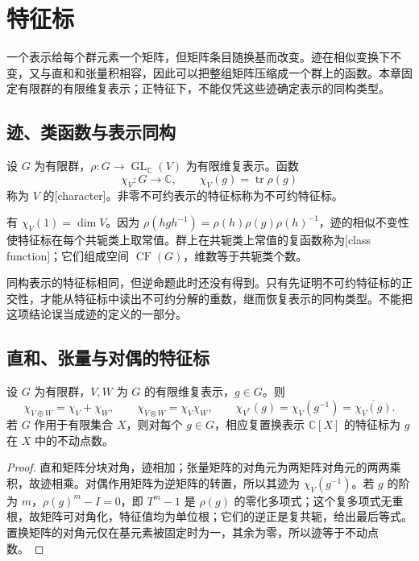 

\section{特征标}
\label{b5:sec:0201}

一个表示给每个群元素一个矩阵，但矩阵条目随换基而改变。迹在相似变换下不变，又与直和和张量积相容，因此可以把整组矩阵压缩成一个群上的函数。本章固定有限群的有限维复表示；正特征下，不能仅凭这些迹确定表示的同构类型。


\subsection{迹、类函数与表示同构}
\label{b5:subsec:0201:01}

\begin{definition}\label{b5:def:character}
	设 \(G\) 为有限群，\(\rho:G\to\operatorname{GL}_{\mathbb C}(V)\) 为有限维复表示。函数
	\[
		\chi_V:G\longrightarrow\mathbb C,\qquad \chi_V(g)=\operatorname{tr}\rho(g)
	\]
	称为 \(V\) 的[character]。非零不可约表示的特征标称为不可约特征标。
\end{definition}

有 \(\chi_V(1)=\dim V\)。因为 \(\rho(hgh^{-1})=\rho(h)\rho(g)\rho(h)^{-1}\)，迹的相似不变性使特征标在每个共轭类上取常值。群上在共轭类上常值的复函数称为[class function]；它们组成空间 \(\operatorname{CF}(G)\)，维数等于共轭类个数。

\ProseParagraphBreak
同构表示的特征标相同，但逆命题此时还没有得到。只有先证明不可约特征标的正交性，才能从特征标中读出不可约分解的重数，继而恢复表示的同构类型。不能把这项结论误当成迹的定义的一部分。

\subsection{直和、张量与对偶的特征标}
\label{b5:subsec:0201:02}

\begin{proposition}\label{b5:prop:character-operations}
	设 \(G\) 为有限群，\(V,W\) 为 \(G\) 的有限维复表示，\(g\in G\)。则
	\[
		\chi_{V\oplus W}=\chi_V+\chi_W,\qquad \chi_{V\otimes W}=\chi_V\chi_W,\qquad \chi_{V^*}(g)=\chi_V(g^{-1})=\overline{\chi_V(g)}.
	\]
	若 \(G\) 作用于有限集合 \(X\)，则对每个 \(g\in G\)，相应复置换表示 \(\mathbb C[X]\) 的特征标为 \(g\) 在 \(X\) 中的不动点数。
\end{proposition}
\begin{proof}
	直和矩阵分块对角，迹相加；张量矩阵的对角元为两矩阵对角元的两两乘积，故迹相乘。对偶作用矩阵为逆矩阵的转置，所以其迹为 \(\chi_V(g^{-1})\)。若 \(g\) 的阶为 \(m\)，\(\rho(g)^m-I=0\)，即 \(T^m-1\) 是 \(\rho(g)\) 的零化多项式；这个复多项式无重根，故矩阵可对角化，特征值均为单位根；它们的逆正是复共轭，给出最后等式。置换矩阵的对角元仅在基元素被固定时为一，其余为零，所以迹等于不动点数。
\end{proof}

